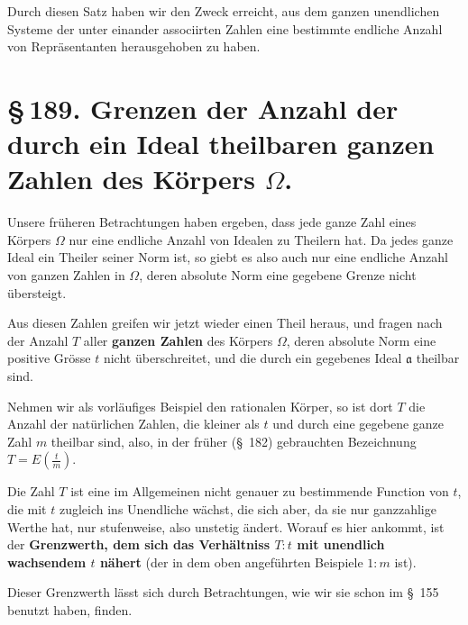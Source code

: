 \documentclass[11pt]{article}
\begin{document}
Durch diesen Satz haben wir den Zweck erreicht, aus dem ganzen unendlichen Systeme der unter einander associirten Zahlen eine bestimmte endliche Anzahl von Repräsentanten herausgehoben zu haben.

\section*{\S\,189. Grenzen der Anzahl der durch ein Ideal theilbaren ganzen Zahlen des Körpers $\Omega$.}

Unsere früheren Betrachtungen haben ergeben, dass jede ganze Zahl eines Körpers $\Omega$ nur eine endliche Anzahl von Idealen zu Theilern hat. Da jedes ganze Ideal ein Theiler seiner Norm ist, so giebt es also auch nur eine endliche Anzahl von ganzen Zahlen in $\Omega$, deren absolute Norm eine gegebene Grenze nicht übersteigt.

Aus diesen Zahlen greifen wir jetzt wieder einen Theil heraus, und fragen nach der Anzahl $T$ aller \textbf{ganzen Zahlen} des Körpers $\Omega$, deren absolute Norm eine positive Grösse $t$ nicht überschreitet, und die durch ein gegebenes Ideal $\mathfrak a$ theilbar sind.

Nehmen wir als vorläufiges Beispiel den rationalen Körper, so ist dort $T$ die Anzahl der natürlichen Zahlen, die kleiner als $t$ und durch eine gegebene ganze Zahl $m$ theilbar sind, also, in der früher (\S~182) gebrauchten Bezeichnung $T=E\left(\frac{t}{m}\right)$.

Die Zahl $T$ ist eine im Allgemeinen nicht genauer zu bestimmende Function von $t$, die mit $t$ zugleich ins Unendliche wächst, die sich aber, da sie nur ganzzahlige Werthe hat, nur stufenweise, also unstetig ändert. Worauf es hier ankommt, ist der \textbf{Grenzwerth, dem sich das Verhältniss $T:t$ mit unendlich wachsendem $t$ nähert} (der in dem oben angeführten Beispiele $1:m$ ist).

Dieser Grenzwerth lässt sich durch Betrachtungen, wie wir sie schon im \S~155 benutzt haben, finden.
\end{document}
